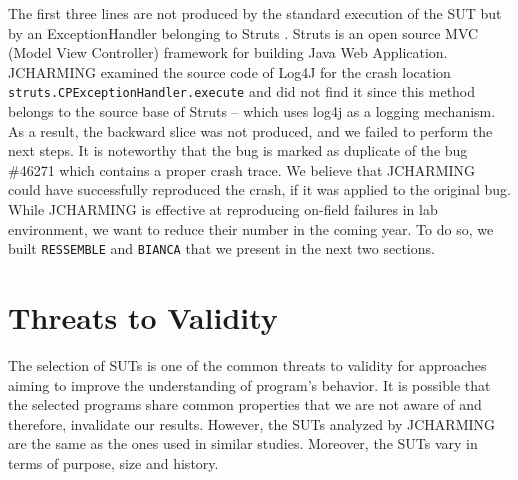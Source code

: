\documentclass[times]{smrauth}
\begin{document}
\noindent{}

The first three lines are not produced by the standard
execution of the SUT but by an ExceptionHandler belonging
to Struts \cite{ApacheSoftwareFoundation2000}. Struts is an open source MVC (Model View
Controller) framework for building Java Web Application.
JCHARMING examined the source code of Log4J for the
crash location {\tt struts.CPExceptionHandler.execute} and did not
find it since this method belongs to the source base of Struts
-- which uses log4j as a logging mechanism. As a result, the
backward slice was not produced, and we failed to perform the
next steps. It is noteworthy that the bug is marked as duplicate
of the bug \#46271 which contains a proper crash trace. We
believe that JCHARMING could have successfully
reproduced the crash, if it was applied to the original bug. \\

While JCHARMING is effective at reproducing on-field failures in lab environment, we want to reduce their number in the coming year. To do so, we built {\tt RESSEMBLE} and {\tt BIANCA} that we present in the next two sections.

\section{Threats to Validity}

The selection of SUTs is one of the common threats to validity
for approaches aiming to improve the understanding of
program's behavior. It is possible that the selected programs
share common properties that we are not aware of and
therefore, invalidate our results. However, the SUTs analyzed
by JCHARMING are the same as the ones used in similar
studies. Moreover, the SUTs vary in terms of purpose, size
and history.
\end{document}
